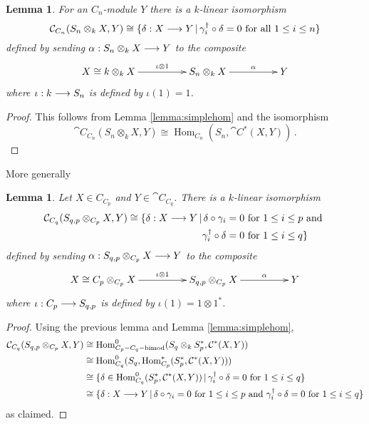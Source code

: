 \documentclass[english,letter paper,12pt,leqno]{article}
\newtheorem{lemma}[theorem]{Lemma}
\theoremstyle{example}
\numberwithin{equation}{section}
\def\Hom{\operatorname{Hom}}
\begin{document}
\begin{lemma}\label{lemma:morphism_out_1} For an $C_n$-module $Y$ there is a $k$-linear isomorphism
\[
\mathcal{C}_{C_n}( S_n \otimes_k X, Y ) \cong \{ \delta: X \longrightarrow Y \,|\, \gamma_i^\dagger \circ \delta = 0 \text{ for all } 1 \le i \le n \}
\]
defined by sending $\alpha: S_n \otimes_k X \longrightarrow Y$ to the composite
\[
\xymatrix@C+2pc{
X \cong k \otimes_k X \ar[r]^-{\iota \otimes 1} & S_n \otimes_k X \ar[r]^-{\alpha} & Y
}
\]
where $\iota: k \longrightarrow S_n$ is defined by $\iota(1) = 1$.
\end{lemma}
\begin{proof}
This follows from Lemma \ref{lemma:simplehom} and the isomorphism
\[
\cat{C}_{C_n}(S_n \otimes_k X, Y ) \cong \Hom_{C_n}( S_n, \cat{C}^*(X,Y) )\,.
\]
\end{proof}

More generally

\begin{lemma}\label{lemma:morphisms_two_forms} Let $X \in C_{C_p}$ and $Y \in \cat{C}_{C_q}$. There is a $k$-linear isomorphism
\begin{align*}
\mathcal{C}_{C_q}( S_{q,p} \otimes_{C_p} X, Y ) \cong \{ \delta: X \longrightarrow Y \,|\, \delta \circ \gamma_i &= 0 \text{ for } 1 \le i \le p \text{ and }\\ \gamma_i^\dagger \circ \delta &= 0 \text{ for } 1 \le i \le q \}
\end{align*}
defined by sending $\alpha: S_{q,p} \otimes_{C_p} X \longrightarrow Y$ to the composite
\[
\xymatrix@C+2pc{
X \cong C_p \otimes_{C_p} X \ar[r]^-{\iota \otimes 1} & S_{q,p} \otimes_{C_p} X \ar[r]^-{\alpha} & Y
}
\]
where $\iota: C_p \longrightarrow S_{q,p}$ is defined by $\iota(1) = 1 \otimes 1^*$.
\end{lemma}
\begin{proof}
Using the previous lemma and Lemma \ref{lemma:simplehom},
\begin{align*}
\cat{C}_{C_q}( S_{q,p} \otimes_{C_p} X, Y ) &\cong \Hom^0_{C_p-C_q-\operatorname{bimod}}( S_{q} \otimes_k S_p^* , \cat{C}^*(X,Y))\\
&\cong \Hom^0_{C_q}( S_q, \Hom^*_{C_p}( S_p^*, \cat{C}^*(X,Y) ))\\
&\cong \{ \delta \in \Hom^0_{C_q}( S_p^*, \cat{C}^*(X,Y) ) \l \gamma_i^\dagger \circ \delta = 0 \text{ for } 1 \le i \le q \}\\
&\cong \{ \delta: X \lto Y \l \delta \circ \gamma_i = 0 \text{ for } 1 \le i \le p \text{ and } \gamma_i^\dagger \circ \delta = 0 \text{ for } 1 \le i \le q \}
\end{align*}
as claimed.
\end{proof}
\end{document}
